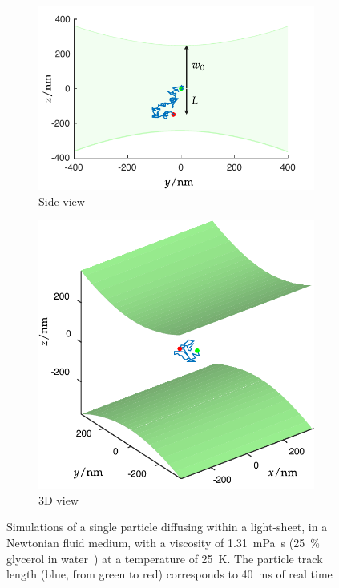 \begin{figure}
  \centering
  \begin{subfigure}[t]{0.8\linewidth}
    \centering
    \includegraphics{./simulation/size_view_diffusion}
    \caption{Side-view}\label{fig:size_view_diffusion}
  \end{subfigure}
  \begin{subfigure}[t]{0.8\linewidth}
    \centering
    \includegraphics{simulation/size_view_diffusion_3d_bigger}
    \caption{3D view}\label{fig:diffusion_3d}
  \end{subfigure}
  \caption[Simulations of a single particle diffusing within a \gls{light-sheet}]{Simulations of a single particle diffusing within a \gls{light-sheet}, in a Newtonian fluid medium, with a viscosity of \SI{1.31}{\milli\pascal\second} (\SI{25}{\percent} glycerol in water~\cite{segurViscosityGlycerolIts1951}) at a temperature of \SI{25}{\kelvin}.
  The particle track length (blue, from green to red) corresponds to \SI{40}{\milli\second} of real time}\label{fig:diffusion}
\end{figure}

